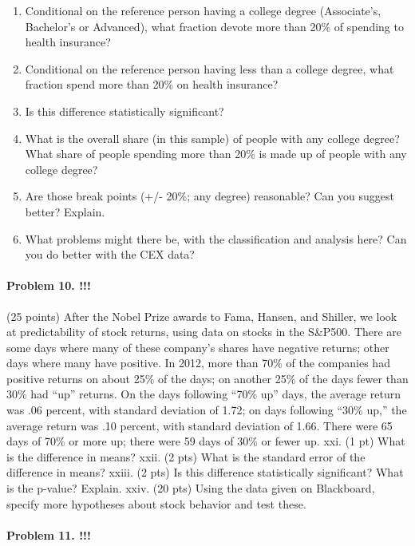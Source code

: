 \documentclass[]{article}
\providecommand{\tightlist}{%
  \setlength{\itemsep}{0pt}\setlength{\parskip}{0pt}}
\let\oldparagraph\paragraph
\renewcommand{\paragraph}[1]{\oldparagraph{#1}\mbox{}}
\begin{document}
\begin{enumerate}
\def\labelenumi{\alph{enumi}.}
\tightlist
\item
  Conditional on the reference person having a college degree
  (Associate's, Bachelor's or Advanced), what fraction devote more than
  20\% of spending to health insurance?
\item
  Conditional on the reference person having less than a college degree,
  what fraction spend more than 20\% on health insurance?
\item
  Is this difference statistically significant?
\item
  What is the overall share (in this sample) of people with any college
  degree? What share of people spending more than 20\% is made up of
  people with any college degree?
\item
  Are those break points (+/- 20\%; any degree) reasonable? Can you
  suggest better? Explain.
\item
  What problems might there be, with the classification and analysis
  here? Can you do better with the CEX data?
\end{enumerate}

\paragraph{Problem 10. !!!}\label{problem-10.}

(25 points) After the Nobel Prize awards to Fama, Hansen, and Shiller,
we look at predictability of stock returns, using data on stocks in the
S\&P500. There are some days where many of these company's shares have
negative returns; other days where many have positive. In 2012, more
than 70\% of the companies had positive returns on about 25\% of the
days; on another 25\% of the days fewer than 30\% had ``up'' returns. On
the days following ``70\% up'' days, the average return was .06 percent,
with standard deviation of 1.72; on days following ``30\% up,'' the
average return was .10 percent, with standard deviation of 1.66. There
were 65 days of 70\% or more up; there were 59 days of 30\% or fewer up.
xxi. (1 pt) What is the difference in means? xxii. (2 pts) What is the
standard error of the difference in means? xxiii. (2 pts) Is this
difference statistically significant? What is the p-value? Explain.
xxiv. (20 pts) Using the data given on Blackboard, specify more
hypotheses about stock behavior and test these.

\paragraph{Problem 11. !!!}\label{problem-11.}
\end{document}

